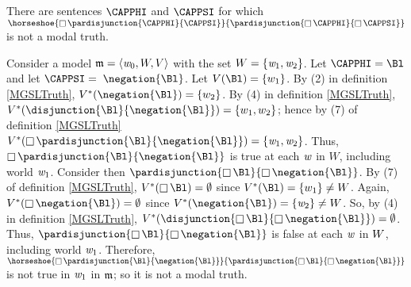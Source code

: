 \begin{majorILnc}{}
There are sentences $\CAPPHI$ and $\CAPPSI$ for which $\horseshoe{\BOX\pardisjunction{\CAPPHI}{\CAPPSI}}{\pardisjunction{\BOX\CAPPHI}{\BOX\CAPPSI}}$ is not a modal truth. 
\end{majorILnc}
\begin{PROOF}
Consider a model $\mathfrak{m}=\langle\mathit{w}_0,W,V\rangle$ with the set $W=\{\mathit{w}_1,\mathit{w}_2\}$. 
Let $\CAPPHI=\Bl$ and let $\CAPPSI=\;\negation{\Bl}$. 
Let $\integer{V}(\Bl)=\{w_1\}$. 
By (2) in definition \ref{MGSLTruth}, $\integer{V}^*(\negation{\Bl})=\{w_2\}$. 
By (4) in definition \ref{MGSLTruth}, $\integer{V}^*(\disjunction{\Bl}{\negation{\Bl}})=\{w_1,w_2\}$; hence by (7) of definition \ref{MGSLTruth} $\integer{V}^*(\BOX\pardisjunction{\Bl}{\negation{\Bl}})=\{\world{w}_1,\world{w}_2\}$. 
Thus, $\BOX\pardisjunction{\Bl}{\negation{\Bl}}$ is true at each $\mathit{w}$ in $W$, including world $\mathit{w}_1$. 
Consider then $\pardisjunction{\BOX\Bl}{\BOX\negation{\Bl}}$. 
By (7) of definition \ref{MGSLTruth}, $\integer{V}^*(\BOX\Bl)=\emptyset$ since $\integer{V}^*(\Bl)=\{w_1\}\neq\integer{W}$. 
Again, $\integer{V}^*(\BOX\negation{\Bl})=\emptyset$ since $\integer{V}^*(\negation{\Bl})=\{\world{w}_2\}\neq\integer{W}$. 
So, by (4) in definition \ref{MGSLTruth}, $\integer{V}^*(\disjunction{\BOX\Bl}{\BOX\negation{\Bl}})=\emptyset$. Thus, $\pardisjunction{\BOX\Bl}{\BOX\negation{\Bl}}$ is false at each $\mathit{w}$ in $W$, including world $\mathit{w}_1$. 
Therefore, $\horseshoe{\BOX\pardisjunction{\Bl}{\negation{\Bl}}}{\pardisjunction{\BOX\Bl}{\BOX\negation{\Bl}}}$ is not true in $\mathit{w}_1$ in $\mathfrak{m}$; so it is not a modal truth. 
\end{PROOF}
